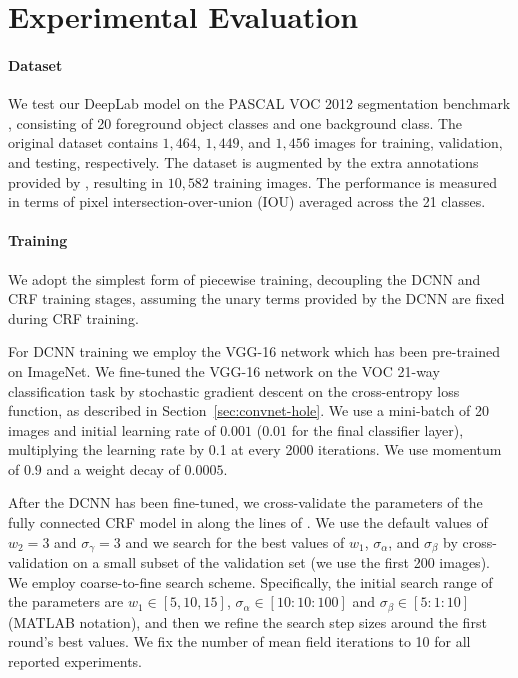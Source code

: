 \section{Experimental Evaluation}
\label{sec:experiments}

\paragraph{Dataset} We test our DeepLab model on the PASCAL VOC 2012 segmentation benchmark \citep{everingham2014pascal}, consisting of 20 foreground object classes and one background class. The original dataset contains $1,464$, $1,449$, and $1,456$ images for training, validation, and testing, respectively. The dataset is augmented by the extra annotations provided by \citet{hariharan2011semantic}, resulting in $10,582$ training images. The performance is measured in terms of pixel intersection-over-union (IOU) averaged across the 21 classes. 

\paragraph{Training} We adopt the simplest form of piecewise training, decoupling the DCNN and CRF training stages, assuming the unary terms provided by the DCNN are fixed during CRF training. 

For DCNN training we employ the VGG-16 network which has been pre-trained on ImageNet. We fine-tuned the VGG-16 network on the VOC 21-way classification task by stochastic gradient descent on the cross-entropy loss function, as described in Section~\ref{sec:convnet-hole}. We use a mini-batch of 20 images and initial learning rate of $0.001$ ($0.01$ for the final classifier layer), multiplying the learning rate by 0.1 at every 2000 iterations. We use momentum of $0.9$ and a weight decay of $0.0005$.

After the DCNN has been fine-tuned, we cross-validate the parameters
of the fully connected CRF model in  along the
lines of \citet{krahenbuhl2011efficient}. We use the default values of
$w_2 = 3$ and  $\sigma_\gamma = 3$ and we search for the best values
of $w_1$, $\sigma_\alpha$, and $\sigma_\beta$ by cross-validation on a
small subset of the validation set (we use the first 200 images). We
employ coarse-to-fine search scheme. Specifically, the initial search
range of the parameters are $w_1 \in [5, 10, 15]$, $\sigma_\alpha \in
[10:10:100]$ and $\sigma_\beta \in [5:1:10]$ (MATLAB notation), and
then we refine the search step sizes around the first round's best
values. We fix the number of mean field iterations to 10 for all
reported experiments.

